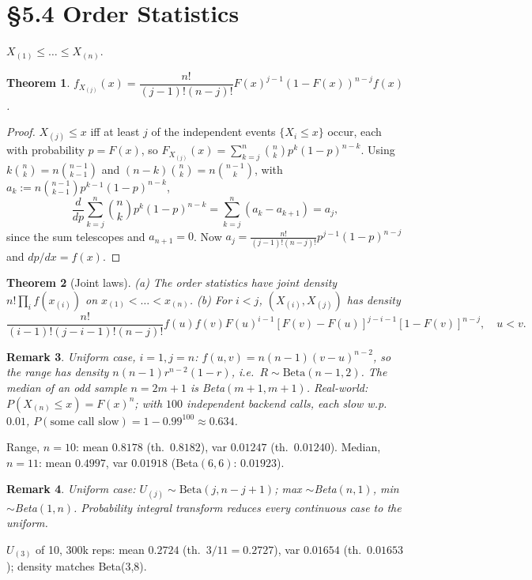 \documentclass[11pt]{article}
\newtheorem{theorem}{Theorem}[section]
\newtheorem{remark}[theorem]{Remark}
\begin{document}
\section{\S5.4 Order Statistics}
$X_{(1)}\le\dots\le X_{(n)}$.
\begin{theorem}
$f_{X_{(j)}}(x)=\dfrac{n!}{(j-1)!(n-j)!}F(x)^{j-1}(1-F(x))^{n-j}f(x)$.
\end{theorem}
\begin{proof}
$X_{(j)}\le x$ iff at least $j$ of the independent events $\{X_i\le x\}$ occur, each with probability $p=F(x)$, so $F_{X_{(j)}}(x)=\sum_{k=j}^n\binom nk p^k(1-p)^{n-k}$. Using $k\binom nk=n\binom{n-1}{k-1}$ and $(n-k)\binom nk=n\binom{n-1}{k}$, with $a_k:=n\binom{n-1}{k-1}p^{k-1}(1-p)^{n-k}$,
\[\frac{d}{dp}\sum_{k=j}^n\binom nk p^k(1-p)^{n-k}=\sum_{k=j}^n(a_k-a_{k+1})=a_j,\]
since the sum telescopes and $a_{n+1}=0$. Now $a_j=\frac{n!}{(j-1)!(n-j)!}p^{j-1}(1-p)^{n-j}$ and $dp/dx=f(x)$.
\end{proof}
\begin{theorem}[Joint laws]
(a) The order statistics have joint density $n!\prod_if(x_{(i)})$ on $x_{(1)}<\dots<x_{(n)}$. (b) For $i<j$, $(X_{(i)},X_{(j)})$ has density
\[\frac{n!}{(i-1)!(j-i-1)!(n-j)!}f(u)f(v)F(u)^{i-1}[F(v)-F(u)]^{j-i-1}[1-F(v)]^{n-j},\quad u<v.\]
\end{theorem}
\begin{remark}
Uniform case, $i=1,j=n$: $f(u,v)=n(n-1)(v-u)^{n-2}$, so the range has density $n(n-1)r^{n-2}(1-r)$, i.e.\ $R\sim\mathrm{Beta}(n-1,2)$. The median of an odd sample $n=2m+1$ is Beta$(m+1,m+1)$. Real-world: $P(X_{(n)}\le x)=F(x)^n$; with $100$ independent backend calls, each slow w.p.\ $0.01$, $P(\text{some call slow})=1-0.99^{100}\approx0.634$.
\end{remark}
\begin{simbox}
Range, $n=10$: mean $0.8178$ (th.\ $0.8182$), var $0.01247$ (th.\ $0.01240$). Median, $n=11$: mean $0.4997$, var $0.01918$ (Beta$(6,6)$: $0.01923$).
\end{simbox}
\begin{remark}
Uniform case: $U_{(j)}\sim\mathrm{Beta}(j,n-j+1)$; max $\sim$Beta$(n,1)$, min $\sim$Beta$(1,n)$. Probability integral transform reduces every continuous case to the uniform.
\end{remark}
\begin{simbox}
$U_{(3)}$ of 10, 300k reps: mean $0.2724$ (th.\ $3/11=0.2727$), var $0.01654$ (th.\ $0.01653$); density matches Beta(3,8).
\end{simbox}
\end{document}
